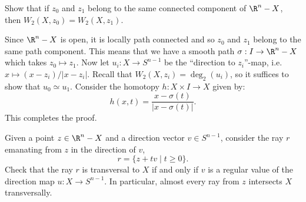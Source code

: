 \documentclass[11pt,letterpaper]{article}
\begin{document}
\begin{problem}
Show that if $z_0$ and $z_1$ belong to the same connected component of $\R^n-X$, then $W_2(X,z_0) = W_2(X,z_1)$.
\end{problem}

\begin{solution}
    Since $\R^n-X$ is open, it is locally path connected and so $z_0$ and $z_1$ belong to the same path component. This means that we have a smooth path $\sigma : I \to \R^n-X$ which takes $z_0 \mapsto z_1$. Now let $u_i : X \to S^{n-1}$ be the ``direction to $z_i$''-map, i.e. $x \mapsto (x-z_i) / |x-z_i|$. Recall that $W_2(X,z_i)=\deg_2(u_i)$, so it suffices to show that $u_0\simeq u_1$. Consider the homotopy $h : X\times I \to X$ given by:
    \[
        h(x,t) = \frac{x - \sigma(t)}{|x-\sigma(t)|}
    .\] 
    This completes the proof.
\end{solution}
    
\begin{problem}
{Given a point $z \in \R^n-X$ and a direction vector $v \in S^{n-1}$, consider the ray $r$ emanating from $z$ in the direction of $v$,
\[
    r = \{z+tv \mid t \geq 0\}.
\]
Check that the ray $r$ is transversal to $X$ if and only if $v$ is a regular value of the direction map $u: X \to S^{n-1}$. In particular, almost every ray from $z$ intersects $X$ transversally.}
\end{problem}
   
\end{document}
